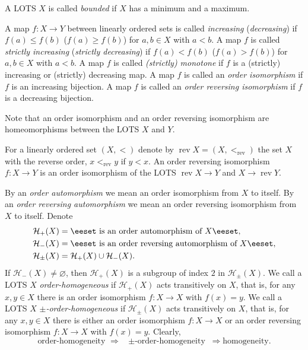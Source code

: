 \documentclass[preprint]{elsarticle}
\def\cH{\mathcal{H}}
\def\es{\varnothing}
\def\set#1{\bbset#1\eeset}
\def\bbset#1:#2\eeset{\{#1\,:\,#2\}}
\def\term#1{{\it #1}}
\theoremstyle{definition}
\theoremstyle{remark}
\def\rarr{\Rightarrow}
\def\rev{\operatorname{rev}}
\def\ilcomma/{\boldsymbol{,}}
\def\ilsymlp{\boldsymbol{(}}
\def\ilsymrp{\boldsymbol{)}}
\def\ilfont#1{\boldsymbol{#1}}
\def\ilfontX#1{\mathrm{\text{\texttt{\textbf{\large #1}}}}}
\def\ilfontX#1{{\text{\texttt{\textbf{\large \upshape #1}}}}}
\def\ilfont#1{\raisebox{-1.2pt}{\ilfontX{#1}}}
\def\ilfontC#1{\raisebox{-0.7pt}{\ilfontX{#1}}}
\def\ilcomma/{\ilfontC{,}}
\def\ilsymlp{\ilfont{(}}
\def\ilsymrp{\ilfont{)}}
\def\ilpp(#1,#2){\ilsymlp#1\ilcomma/ #2\ilsymrp}
\def\oip#1{\cH_{+}(#1)}
\def\oim#1{\cH_{-}(#1)}
\def\oipm#1{\cH_{\pm}(#1)}
\begin{document}
A LOTS $X$ is called \term{bounded} if $X$ has a minimum and a maximum.


A map $f: X\to Y$ between linearly ordered sets is called \term{increasing} (\term{decreasing}) if $f(a)\leq f(b)$ ($f(a)\geq f(b)$) for $a,b\in X$ with $a<b$. A map $f$ is called \term{strictly increasing} (\term{strictly decreasing}) if $f(a)< f(b)$ ($f(a)> f(b)$) for $a,b\in X$ with $a<b$. A map $f$ is called \term{(strictly) monotone} if $f$ is a (strictly) increasing or (strictly) decreasing map. A map $f$ is called an \term{order isomorphism} if $f$ is an increasing bijection. A map $f$ is called an \term{order reversing isomorphism} if $f$ is a decreasing bijection.

Note that an order isomorphism and an order reversing isomorphism are homeomorphisms between the LOTS $X$ and $Y$.

For a linearly ordered set $(X,<)$ denote by $\rev X=(X,<_{\rev})$ the set $X$ with the reverse order, $x<_{\rev} y$ if $y<x$. An order reversing isomorphism $f: X\to Y$ is an order isomorphism of the LOTS $\rev X\to Y$ and $X\to \rev Y$.

By an \term{order automorphism} we mean an order isomorphism from $X$ to itself.
By an \term{order reversing automorphism} we mean an order reversing isomorphism from $X$ to itself.
Denote
\begin{align*}
\oip X &= \set{f: f\text{ is an order automorphism of }X},
\\
\oim X &= \set{f: f\text{ is an order reversing automorphism of }X},
\\
\oipm X &= \oip X \cup \oim X.
\end{align*}
If $\oim X\neq\es$, then $\oip X$ is a subgroup of index $2$ in $\oipm X$.
We call a LOTS $X$ \term{order-homogeneous} if $\oip X$ acts transitively on $X$, that is, for any $x,y\in X$ there is an order isomorphism $f: X\to X$ with $f(x)=y$.
We call a LOTS $X$ \term{$\pm$-order-homogeneous} if $\oipm X$ acts transitively on $X$, that is, for any $x,y\in X$ there is either an order isomorphism $f: X\to X$ or an order reversing isomorphism $f: X\to X$ with $f(x)=y$. Clearly,
\[
\text{order-homogeneity }\rarr \text{ $\pm$-order-homogeneity }\rarr \text{homogeneity.}
\]
\end{document}
